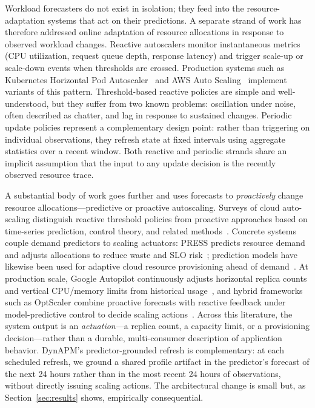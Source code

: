 \documentclass[manuscript,screen,review,anonymous]{acmart}
\begin{document}
Workload forecasters do not exist in isolation; they feed into
the resource-adaptation systems that act on their predictions.
A separate strand of work has therefore addressed online
adaptation of resource allocations in response to observed
workload changes. Reactive autoscalers monitor instantaneous
metrics (CPU utilization, request queue depth, response
latency) and trigger scale-up or scale-down events when
thresholds are crossed. Production systems such as Kubernetes
Horizontal Pod Autoscaler~\cite{kubernetes_hpa} and AWS Auto
Scaling~\cite{aws_autoscaling} implement variants of this
pattern. Threshold-based reactive policies are simple and
well-understood, but they suffer from two known problems:
oscillation under noise, often described as chatter, and lag
in response to sustained changes. Periodic update policies
represent a complementary design point: rather than triggering
on individual observations, they refresh state at fixed
intervals using aggregate statistics over a recent window.
Both reactive and periodic strands share an implicit
assumption that the input to any update decision is the
recently observed resource trace.

A substantial body of work goes further and uses forecasts
to \emph{proactively} change resource allocations---predictive
or proactive autoscaling. Surveys of cloud auto-scaling
distinguish reactive threshold policies from proactive
approaches based on time-series prediction, control theory,
and related methods~\cite{lorido_botran_autoscaling_2014,qu_autoscaling_survey_2018}.
Concrete systems couple demand predictors to scaling
actuators: PRESS predicts resource demand and adjusts
allocations to reduce waste and SLO risk~\cite{gong_press_2010};
prediction models have likewise been used for adaptive cloud
resource provisioning ahead of demand~\cite{islam_prediction_provisioning_2012}.
At production scale, Google Autopilot continuously adjusts
horizontal replica counts and vertical CPU/memory limits from
historical usage~\cite{rzadca_autopilot_2020}, and hybrid
frameworks such as OptScaler combine proactive forecasts with
reactive feedback under model-predictive control to decide
scaling actions~\cite{zou_optscaler_2024}. Across this
literature, the system output is an \emph{actuation}---a replica
count, a capacity limit, or a provisioning decision---rather than
a durable, multi-consumer description of application behavior.
DynAPM's predictor-grounded refresh is complementary: at each
scheduled refresh, we ground a shared profile artifact in the
predictor's forecast of the next 24 hours rather than in the most
recent 24 hours of observations, without directly issuing scaling
actions. The architectural change is small but, as
Section~\ref{sec:results} shows, empirically consequential.
\end{document}
